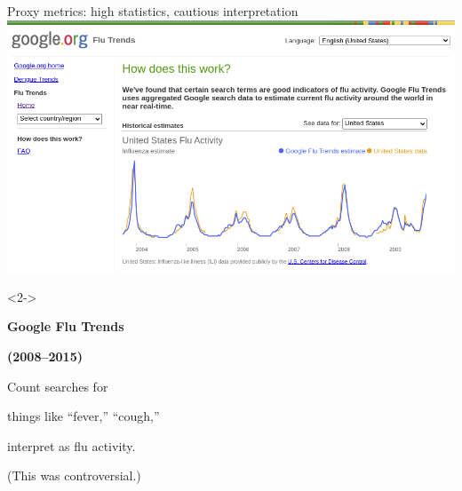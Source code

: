 \documentclass[aspectratio=169]{beamer}
\begin{document}
\begin{frame}{Proxy metrics: high statistics, cautious interpretation}
\vspace{0.25 cm}
\mbox{\hspace{0.75 cm}\includegraphics[width=\linewidth]{google-flu-trends.png}}

\begin{uncoverenv}<2->
\vspace{-3.35 cm}
\hspace{-0.25 cm}\begin{minipage}{0.3\linewidth}
{\bf Google Flu Trends}

{\bf (2008--2015)}

\small
\vspace{0.25 cm}
Count searches for

things like ``fever,'' ``cough,''

interpret as flu activity.

\vspace{0.25 cm}
(This was controversial.)
\end{minipage}
\vspace{3.35 cm}
\end{uncoverenv}
\end{frame}
\end{document}
